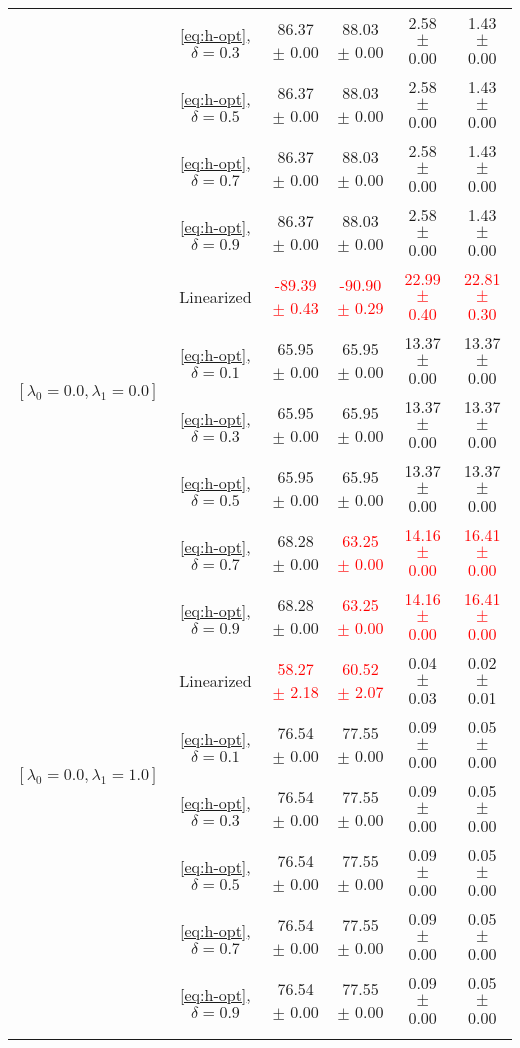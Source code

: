 \begin{table}[h]
\begin{adjustbox}{max width=1\textwidth,center}
\begin{tabular}{cccccc}
    & \ref{eq:h-opt}, $\delta=0.3$  & 86.37 $\pm$ 0.00 & 88.03 $\pm$ 0.00   & 2.58 $\pm$ 0.00 & 1.43 $\pm$ 0.00\\
    & \ref{eq:h-opt}, $\delta=0.5$  & 86.37 $\pm$ 0.00 & 88.03 $\pm$ 0.00   & 2.58 $\pm$ 0.00 & 1.43 $\pm$ 0.00\\
    & \ref{eq:h-opt}, $\delta=0.7$  & 86.37 $\pm$ 0.00 & 88.03 $\pm$ 0.00   & 2.58 $\pm$ 0.00 & 1.43 $\pm$ 0.00\\
    & \ref{eq:h-opt}, $\delta=0.9$  & 86.37 $\pm$ 0.00 & 88.03 $\pm$ 0.00   & 2.58 $\pm$ 0.00 & 1.43 $\pm$ 0.00  \\
    \midrule
    \multirow{4}{*}{$[\lambda_0=0.0, \lambda_1 = 0.0]$}
    & Linearized & \textcolor{red}{-89.39 $\pm$ 0.43} & \textcolor{red}{-90.90 $\pm$ 0.29 }  & \textcolor{red}{22.99 $\pm$ 0.40 }& \textcolor{red}{22.81 $\pm$ 0.30 }  \\ 
    & \ref{eq:h-opt}, $\delta=0.1$  & 65.95 $\pm$ 0.00 & 65.95 $\pm$ 0.00   & 13.37 $\pm$ 0.00 & 13.37 $\pm$ 0.00  \\
    & \ref{eq:h-opt}, $\delta=0.3$  & 65.95 $\pm$ 0.00 & 65.95 $\pm$ 0.00   & 13.37 $\pm$ 0.00 & 13.37 $\pm$ 0.00\\
    & \ref{eq:h-opt}, $\delta=0.5$  & 65.95 $\pm$ 0.00 & 65.95 $\pm$ 0.00   & 13.37 $\pm$ 0.00 & 13.37 $\pm$ 0.00\\
    & \ref{eq:h-opt}, $\delta=0.7$  & 68.28 $\pm$ 0.00 & \textcolor{red}{63.25 $\pm$ 0.00 }  & \textcolor{red}{14.16 $\pm$ 0.00 }& \textcolor{red}{16.41 $\pm$ 0.00 } \\
    & \ref{eq:h-opt}, $\delta=0.9$  & 68.28 $\pm$ 0.00 & \textcolor{red}{63.25 $\pm$ 0.00 }  & \textcolor{red}{14.16 $\pm$ 0.00 }& \textcolor{red}{16.41 $\pm$ 0.00 }\\
    \midrule
    \multirow{4}{*}{$[\lambda_0=0.0, \lambda_1 = 1.0]$}
    & Linearized & \textcolor{red}{58.27 $\pm$ 2.18} & \textcolor{red}{60.52 $\pm$ 2.07 }  & 0.04 $\pm$ 0.03 & 0.02 $\pm$ 0.01  \\ 
    & \ref{eq:h-opt}, $\delta=0.1$  & 76.54 $\pm$ 0.00 & 77.55 $\pm$ 0.00   & 0.09 $\pm$ 0.00 & 0.05 $\pm$ 0.00\\
    & \ref{eq:h-opt}, $\delta=0.3$  & 76.54 $\pm$ 0.00 & 77.55 $\pm$ 0.00   & 0.09 $\pm$ 0.00 & 0.05 $\pm$ 0.00\\
    & \ref{eq:h-opt}, $\delta=0.5$  & 76.54 $\pm$ 0.00 & 77.55 $\pm$ 0.00   & 0.09 $\pm$ 0.00 & 0.05 $\pm$ 0.00\\
    & \ref{eq:h-opt}, $\delta=0.7$  & 76.54 $\pm$ 0.00 & 77.55 $\pm$ 0.00   & 0.09 $\pm$ 0.00 & 0.05 $\pm$ 0.00\\
    & \ref{eq:h-opt}, $\delta=0.9$  & 76.54 $\pm$ 0.00 & 77.55 $\pm$ 0.00   & 0.09 $\pm$ 0.00 & 0.05 $\pm$ 0.00  \\
    \bottomrule
    \addtocounter{table}{-1} %
    \end{tabular}
    \end{adjustbox}
\end{table}




